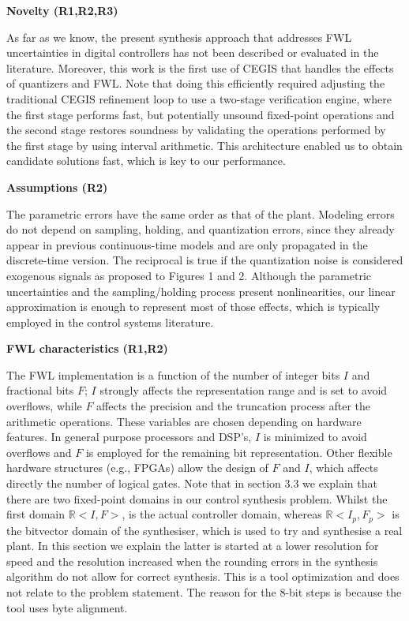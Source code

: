 \documentclass[11pt]{article}
\begin{document}
\setcounter{page}{1}
\thispagestyle{empty}

\vspace*{1cm}


\noindent \textbf{Novelty (R1,R2,R3)}

\noindent As far as we know, the present synthesis approach that addresses FWL
uncertainties in digital controllers has not been described or
evaluated in the literature.  Moreover, this work is the first use of
CEGIS that handles the effects of quantizers and FWL.  Note that doing
this efficiently required adjusting the traditional CEGIS refinement
loop to use a two-stage verification engine, where the first stage
performs fast, but potentially unsound fixed-point operations and the
second stage restores soundness by validating the operations performed
by the first stage by using interval arithmetic.  This architecture 
enabled us to obtain candidate solutions fast, which is key to our 
performance.

\noindent \textbf{Assumptions (R2)}

\noindent The parametric errors have the same order as that of the
plant. Modeling errors do not depend on sampling, holding, and
quantization errors, since they already appear in previous 
continuous-time models and are only propagated in the discrete-time version. 
The reciprocal is true if the quantization noise is considered exogenous
signals as proposed to Figures 1 and 2. Although the parametric
uncertainties and the sampling/holding process present nonlinearities,
our linear approximation is enough to represent most of those effects,
which is typically employed in the control systems literature.

\noindent \textbf{FWL characteristics (R1,R2)}

\noindent The FWL implementation is a function of the number of integer bits $I$
and fractional bits $F$; $I$ strongly affects the representation range
and is set to avoid overflows, while $F$ affects the precision and the
truncation process after the arithmetic operations. These variables are chosen
depending on hardware features. In general purpose processors and
DSP's, $I$ is minimized to avoid overflows and $F$ is employed for the
remaining bit representation. Other flexible hardware structures
(e.g., FPGAs) allow the design of $F$ and $I$, which affects directly
the number of logical gates. Note that in section 3.3 we explain that
there are two fixed-point domains in our control synthesis
problem. Whilst the first domain $\mathbb{R}<I,F>$, is the actual
controller domain, whereas $\mathbb{R}<I_p,F_p>$ is the bitvector
domain of the synthesiser, which is used to try and synthesise a real
plant. In this section we explain the latter is started at a lower
resolution for speed and the resolution increased when the rounding
errors in the synthesis algorithm do not allow for correct
synthesis. This is a tool optimization and does not relate to the
problem statement. The reason for the 8-bit steps is because the tool
uses byte alignment.
\end{document}
